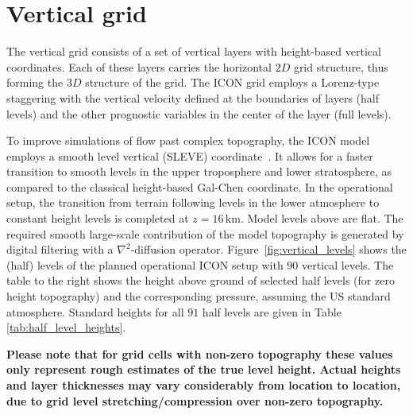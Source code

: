\section{Vertical grid}

The vertical grid consists of a set of vertical layers with height-based vertical coordinates.
Each of these layers carries the horizontal $2D$ grid structure, thus forming the $3D$ structure of the grid.
The ICON grid employs a Lorenz-type staggering with the vertical velocity defined at the boundaries of layers (half levels) 
and the other prognostic variables in the center of the layer (full levels).

To improve simulations of flow past complex topography, the ICON model employs a smooth level vertical (SLEVE) coordinate~\citep{Leuenberger2010}. 
It allows for a faster transition to smooth levels in the upper troposphere and lower stratosphere, as compared to the classical height-based Gal-Chen 
coordinate. In the operational setup, the transition from terrain following levels in the lower atmosphere to constant height levels is completed 
at $z=16\,\mathrm{km}$. Model levels above are flat. The required smooth large-scale contribution of the model topography is generated by 
digital filtering with a $\nabla^2$-diffusion operator. Figure~\ref{fig:vertical_levels} shows the (half) levels of the planned operational 
ICON setup with 90 vertical levels. The table to the right shows the height above ground of selected half levels (for zero height topography) 
and the corresponding pressure, assuming the US standard atmosphere. Standard heights for all $91$ half levels are given in Table 
\ref{tab:half_level_heights}.

\textbf{Please note that for grid cells with non-zero topography these values only represent rough estimates of the true level height. 
Actual heights and layer thicknesses may vary considerably from location to location, due to grid level stretching/compression over 
non-zero topography.}
  



